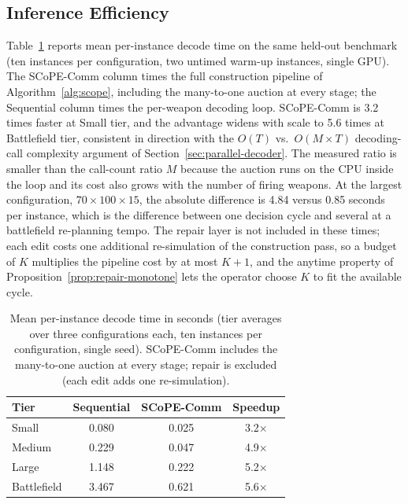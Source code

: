 \subsection{Inference Efficiency}
\label{sec:efficiency}

Table~\ref{tab:efficiency} reports mean per-instance decode time on the same held-out benchmark (ten instances per configuration, two untimed warm-up instances, single GPU). The SCoPE-Comm column times the full construction pipeline of Algorithm~\ref{alg:scope}, including the many-to-one auction at every stage; the Sequential column times the per-weapon decoding loop. SCoPE-Comm is 3.2 times faster at Small tier, and the advantage widens with scale to 5.6 times at Battlefield tier, consistent in direction with the $O(T)$ vs.\ $O(M{\times}T)$ decoding-call complexity argument of Section~\ref{sec:parallel-decoder}. The measured ratio is smaller than the call-count ratio $M$ because the auction runs on the CPU inside the loop and its cost also grows with the number of firing weapons. At the largest configuration, $70{\times}100{\times}15$, the absolute difference is 4.84 versus 0.85 seconds per instance, which is the difference between one decision cycle and several at a battlefield re-planning tempo. The repair layer is not included in these times; each edit costs one additional re-simulation of the construction pass, so a budget of $K$ multiplies the pipeline cost by at most $K{+}1$, and the anytime property of Proposition~\ref{prop:repair-monotone} lets the operator choose $K$ to fit the available cycle.

\begin{table}[htbp]
\centering
\small
\caption{Mean per-instance decode time in seconds (tier averages over three configurations each, ten instances per configuration, single seed). SCoPE-Comm includes the many-to-one auction at every stage; repair is excluded (each edit adds one re-simulation).}
\label{tab:efficiency}
\begin{tabular}{l|ccc}
\hline
\textbf{Tier} & \textbf{Sequential} & \textbf{SCoPE-Comm} & \textbf{Speedup} \\ \hline
Small & 0.080 & 0.025 & 3.2$\times$ \\
Medium & 0.229 & 0.047 & 4.9$\times$ \\
Large & 1.148 & 0.222 & 5.2$\times$ \\
Battlefield & 3.467 & 0.621 & 5.6$\times$ \\ \hline
\end{tabular}
\end{table}

